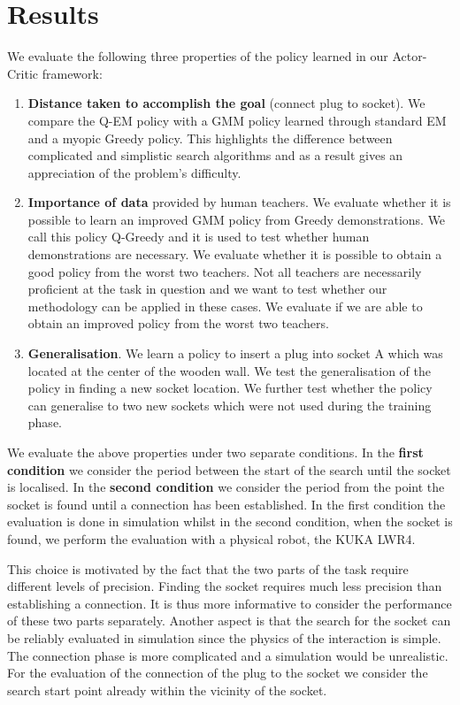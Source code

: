 \FloatBarrier
\section{Results}\label{ch4:results}

We evaluate the following three properties of the policy learned in our Actor-Critic framework:
\begin{enumerate}
 \item \textbf{Distance taken to accomplish the goal} (connect plug to socket). We compare the Q-EM policy with 
 a GMM policy learned through standard EM and a myopic Greedy policy. This highlights the difference between complicated and simplistic  
  search algorithms and as a result gives an appreciation of the problem's difficulty.
 \item \textbf{Importance of data} provided by human teachers. We evaluate whether it is possible to learn 
 an improved GMM policy from Greedy demonstrations. We call this policy Q-Greedy and it is used to test whether 
 human demonstrations are necessary.
 We evaluate whether it is possible to obtain a good policy from the worst two teachers. Not all teachers 
 are necessarily proficient at the task in question and we want to test whether our methodology can be applied in these
 cases. We evaluate if we  are able to obtain an improved policy from the worst two teachers.
 \item \textbf{Generalisation}. We learn a policy to insert a plug into socket A which was located at the center of the wooden 
 wall. We test the generalisation of the policy in finding a new socket location. We further test whether the policy can generalise to two new sockets 
 which were not used during the training phase.
\end{enumerate}

We evaluate the above properties under two separate conditions. In the \textbf{first condition} we consider the period between the start 
of the search until the socket is localised. In the \textbf{second condition} we consider the period from the point the socket is found until
a connection has been established. In the first condition the evaluation is done in simulation whilst 
in the second condition, when the socket is found, we perform the evaluation with a physical robot, the KUKA LWR4.

This choice is motivated by the fact that the two parts of the task require different levels of precision.
Finding the socket requires much less precision than establishing a connection. It is thus
more informative to consider the performance of these two parts separately.
Another aspect is that the search for the socket can be reliably evaluated in simulation since the physics of the interaction
is simple. The connection phase is more complicated and a simulation would be unrealistic.
For the evaluation of the connection of the plug to the socket we consider the search start point already within 
the vicinity of the socket.

